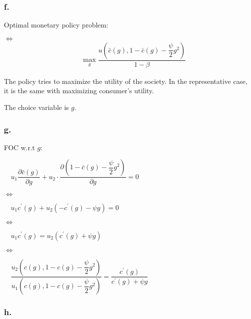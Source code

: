 \documentclass{article}
\begin{document}
\subsubsection*{f.}

Optimal monetary policy problem:


$\iff$
\begin{equation*}
    \begin{aligned}
    & \quad\max_{g} \dfrac{u\left(\bar{c}\left(g\right),1-\bar{c}\left(g\right)-\dfrac{\psi}{2}g^{2}\right)}{1-\beta}
    \end{aligned}
\end{equation*}

The policy tries to maximize the utility of the society. In the representative case, it is the same with maximizing consumer's utility.

The choice variable is $g$.

\subsubsection*{g.}

FOC w.r.t $g$:

$\quad u_{1}\dfrac{\partial \bar{c}\left(g\right)}{\partial g}+u_{2}\cdot\dfrac{\partial \left(1-\bar{c}\left(g\right)-\dfrac{\psi}{2}g^{2}\right)}{\partial g}=0$

$\iff$

$\quad u_{1}c^{\prime}\left(g\right)+u_{2}\left(-c^{\prime}\left(g\right)-\psi g\right)=0$

$\iff$

$\quad u_{1}c^{\prime}\left(g\right)=u_{2}\left(c^{\prime}\left(g\right)+\psi g\right)$

$\iff$

$\quad \dfrac{u_{2}\left(c\left(g\right), 1-c\left(g\right)-\dfrac{\psi}{2}g^{2}\right)}{u_{1}\left(c\left(g\right), 1-c\left(g\right)-\dfrac{\psi}{2}g^{2}\right)}=\dfrac{c^{\prime}\left(g\right)}{c^{\prime}\left(g\right)+\psi g}$

\subsubsection*{h.}
\end{document}
